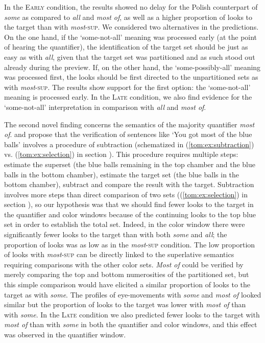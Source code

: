 \documentclass[output=paper]{langscibook}
\begin{document}
In the \textsc{Early} condition, the results showed no delay for the Polish counterpart of \textit{some} as compared to
\textit{all} and \textit{most of}, as well as a higher proportion of looks to the target than with
\textit{most}\textsc{-sup}. We considered two alternatives in the predictions. On the one hand, if the
`some-not-all' meaning was processed early (at the point of hearing the quantifier), the identification of the
target set should be just as easy as with \textit{all}, given that the target set was partitioned and as such stood out
already during the preview. If, on the other hand, the `some-possibly-all' meaning was processed
first, the looks should be first directed to the unpartitioned sets as with \textit{most}\textsc{-sup}. The results
show support for the first option: the `some-not-all' meaning is processed early. In the \textsc{Late} condition, we also
find evidence for the `some-not-all' interpretation in comparison with \textit{all} and \textit{most of}.

The second novel finding concerns the semantics of the majority quantifier \textit{most of}. \citet{pietroski2009meaning} and
\citet{lidz2011interface} propose that the verification of sentences like `You got most of the blue
balls' involves a procedure of subtraction (schematized in (\ref{tom:ex:subtraction}) vs. (\ref{tom:ex:selection}) in section ). This procedure requires
multiple steps: estimate the superset (the blue balls remaining in the top chamber and the blue balls in the bottom
chamber), estimate the target set (the blue balls in the bottom chamber), subtract and compare the result with the
target. Subtraction involves more steps than direct comparison of two sets ((\ref{tom:ex:selection}) in section ), so our hypothesis was
that we should find fewer looks to the target in the quantifier and color windows because of the continuing looks to
the top blue set in order to establish the total set. Indeed, in the color window there were significantly fewer looks
to the target than with both \textit{some} and \textit{all}; the proportion of looks was as low as in the
\textit{most}\textsc{-sup} condition. The low proportion of looks with \textit{most}\textsc{-sup} can be
directly linked to the superlative semantics requiring comparisons with the other color sets. \textit{Most of} could be
verified by merely comparing the top and bottom numerosities of the partitioned set, but this simple comparison would
have elicited a similar proportion of looks to the target as with \textit{some}. The profiles of eye-movements with
\textit{some} and \textit{most of} looked similar but the proportion of looks to the target was lower with \textit{most
of} than with \textit{some}. In the \textsc{Late} condition we also predicted fewer looks to the target with \textit{most of}
than with \textit{some} in both the quantifier and color windows, and this effect was observed in the quantifier
window.
\end{document}
